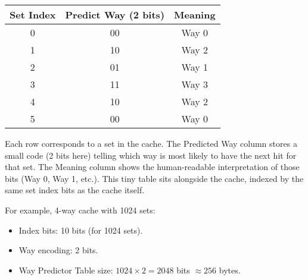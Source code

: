 \begin{itemize}
\begin{itemize}
        \begin{table}[!htp]
            \centering
            \begin{tabular}{@{} c c c @{}}
                \toprule
                Set Index & Predict Way (2 bits) & Meaning \\
                \midrule
                0   & 00    & Way 0 \\ [.3em]
                1   & 10    & Way 2 \\ [.3em]
                2   & 01    & Way 1 \\ [.3em]
                3   & 11    & Way 3 \\ [.3em]
                4   & 10    & Way 2 \\ [.3em]
                5   & 00    & Way 0 \\
                \bottomrule
            \end{tabular}
        \end{table}

        Each row corresponds to a set in the cache. The Predicted Way column stores a small code (2 bits here) telling which way is most likely to have the next hit for that set. The Meaning column shows the human-readable interpretation of those bits (Way 0, Way 1, etc.). This tiny table sits alongside the cache, indexed by the same set index bits as the cache itself.

        For example, 4-way cache with 1024 sets:
        \begin{itemize}
            \item Index bits: 10 bits (for 1024 sets).
            \item Way encoding: 2 bits.
            \item Way Predictor Table size: $1024 \times 2 = 2048$ bits $\approx 256$ bytes.
        \end{itemize}


\end{itemize}
\end{itemize}
